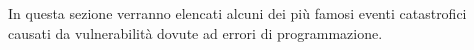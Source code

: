In questa sezione verranno elencati alcuni dei più famosi eventi catastrofici causati da vulnerabilità dovute ad errori di programmazione.
